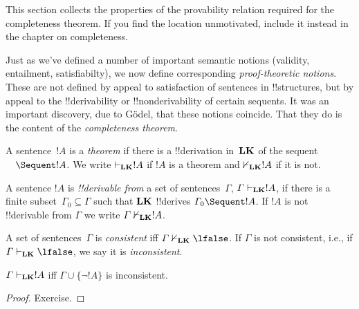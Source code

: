 \documentclass[../../../include/open-logic-section]{subfiles}
\begin{document}
\begin{editorial}
  This section collects the properties of the provability relation
  required for the completeness theorem.  If you find the location
  unmotivated, include it instead in the chapter on completeness.
\end{editorial}


\begin{explain}
Just as we've defined a number of important semantic notions
(validity, entailment, satisfiabilty), we now define corresponding
\emph{proof-theoretic notions}.  These are not defined by appeal to
satisfaction of sentences in !!{structure}s, but by appeal to the
!!{derivability} or !!{nonderivability} of certain sequents.  It was
an important discovery, due to G\"odel, that these notions coincide.
That they do is the content of the \emph{completeness theorem}.
\end{explain}

\begin{defn}[Theorems]
A sentence~$!A$ is a \emph{theorem} if there is a !!{derivation}
in~$\mathbf{LK}$ of the sequent $\quad \Sequent !A$.  We write
$\Proves[\Log{LK}] !A$ if $!A$ is a theorem and $\Proves/[\Log{LK}]
!A$ if it is not.
\end{defn}

\begin{defn}[!!^{derivability}]
A sentence $!A$ is \emph{!!{derivable} from} a set of
sentences~$\Gamma$, $\Gamma \Proves[\Log{LK}] !A$, if there is a
finite subset~$\Gamma_0 \subseteq \Gamma$ such that $\mathbf{LK}$
!!{derive}s $\Gamma_0 \Sequent !A$.  If $!A$ is not !!{derivable} from
$\Gamma$ we write $\Gamma \Proves/[\Log{LK}] !A$.
\end{defn}

\begin{defn}[Consistency]
A set of sentences~$\Gamma$ is \emph{consistent} iff $\Gamma
\Proves/[\Log{LK}] \lfalse$.  If $\Gamma$ is not consistent, i.e., if
$\Gamma \Proves[\Log{LK}] \lfalse$, we say it is \emph{inconsistent}.
\end{defn}

\begin{prop}
$\Gamma \Proves[\Log{LK}] !A$ iff $\Gamma \cup \{\lnot !A\}$ is inconsistent.
\end{prop}

\begin{proof}
Exercise.
\end{proof}
\end{document}
